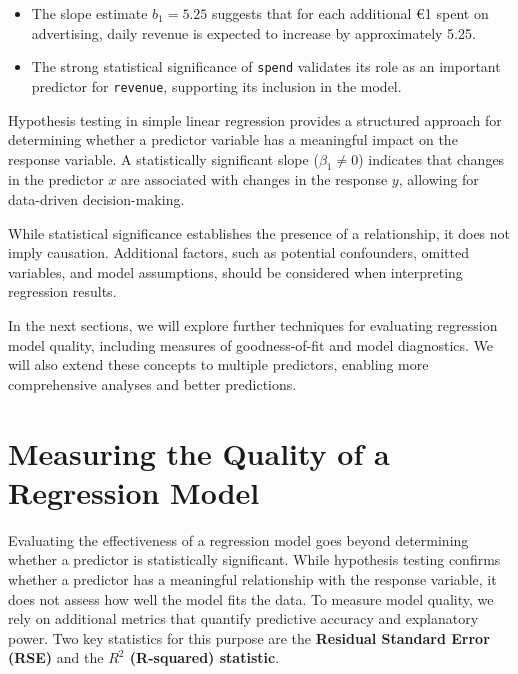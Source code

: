 \documentclass[
]{book}
\newcommand{\passthrough}[1]{#1}
\providecommand{\tightlist}{%
  \setlength{\itemsep}{0pt}\setlength{\parskip}{0pt}}
\theoremstyle{definition}
\theoremstyle{definition}
\theoremstyle{definition}
\theoremstyle{definition}
\theoremstyle{remark}
\begin{document}
\begin{itemize}
\tightlist
\item
  The slope estimate \(b_1 = 5.25\) suggests that for each additional €1 spent on advertising, daily revenue is expected to increase by approximately 5.25.\\
\item
  The strong statistical significance of \passthrough{\lstinline!spend!} validates its role as an important predictor for \passthrough{\lstinline!revenue!}, supporting its inclusion in the model.
\end{itemize}

Hypothesis testing in simple linear regression provides a structured approach for determining whether a predictor variable has a meaningful impact on the response variable. A statistically significant slope (\(\beta_1 \neq 0\)) indicates that changes in the predictor \(x\) are associated with changes in the response \(y\), allowing for data-driven decision-making.

While statistical significance establishes the presence of a relationship, it does not imply causation. Additional factors, such as potential confounders, omitted variables, and model assumptions, should be considered when interpreting regression results.

In the next sections, we will explore further techniques for evaluating regression model quality, including measures of goodness-of-fit and model diagnostics. We will also extend these concepts to multiple predictors, enabling more comprehensive analyses and better predictions.

\section*{Measuring the Quality of a Regression Model}\label{measuring-the-quality-of-a-regression-model}

Evaluating the effectiveness of a regression model goes beyond determining whether a predictor is statistically significant. While hypothesis testing confirms whether a predictor has a meaningful relationship with the response variable, it does not assess how well the model fits the data. To measure model quality, we rely on additional metrics that quantify predictive accuracy and explanatory power. Two key statistics for this purpose are the \textbf{Residual Standard Error (RSE)} and the \textbf{\(R^2\) (R-squared) statistic}.
\end{document}
